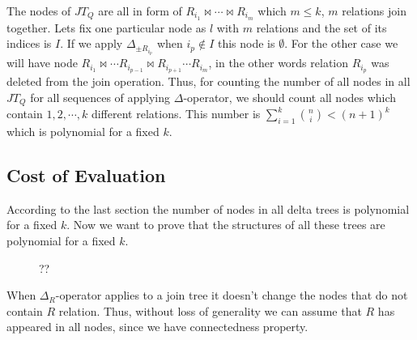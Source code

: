 \documentclass[12pt]{article}
\begin{document}
The nodes of $JT_{Q}$ are all in form of $R_{i_{1}}\bowtie\cdots\bowtie R_{i_{m}}$ which $m\leq k$, $m$ relations join together. Lets fix one particular node as $l$ with $m$ relations and the set of its indices is $I$. If we apply $\Delta_{\pm R_{i_{p}}}$ when $i_{p}\not\in I$ this node is $\emptyset$. For the other case we will have node $R_{i_{1}}\bowtie\cdots R_{i_{p-1}}\bowtie R_{i_{p+1}}\cdots R_{i_{m}}$, in the other words relation $R_{i_{p}}$ was deleted from the join operation. Thus, for counting the number of all nodes in all $JT_{Q}$ for all sequences of applying $\Delta$-operator, we should count all nodes which contain $1,2,\cdots,k$ different relations. This number is 
$\sum_{i=1}^{k}{\binom{n}{i}}<(n+1)^{k}$ which is polynomial for a fixed $k$. \\

\subsection{Cost of Evaluation}
\label{subsection:eval}
According to the last section the number of nodes in all delta trees is polynomial for a fixed $k$. Now we want to prove that the structures of all these trees are polynomial for a fixed $k$. \\

\begin{figure}[htbp]
\begin{center}
\end{center}
\caption{??}
\label{fig2}
\end{figure}

When $\Delta_{R}$-operator applies to a join tree it doesn't change the nodes that do not contain $R$ relation. Thus, without loss of generality we can assume that $R$ has appeared in all nodes, since we have connectedness property. 
\end{document}
